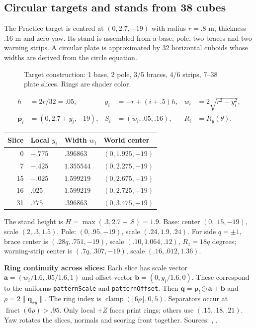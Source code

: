 \subsection{Circular targets and stands from 38 cubes}
The Practice target is centred at $(0,2.7,-19)$ with radius $r=.8$ m, thickness $.16$ m and zero yaw. Its stand is assembled from a base, pole, two braces and two warning strips. A circular plate is approximated by 32 horizontal cuboids whose widths are derived from the circle equation.
\begin{figure}[htbp]

\caption{Target construction: 1 base, 2 pole, 3/5 braces, 4/6 strips, 7--38 plate slices. Rings are shader color.}
\end{figure}
\begin{align}
 h&=2r/32=.05, & y_i&=-r+(i+.5)h, & w_i&=2\sqrt{r^2-y_i^2},\\
 \mathbf p_i&=(0,2.7+y_i,-19), & S_i&=(w_i,.05,.16), & R_i&=R_y(\theta).
\end{align}
\begin{center}\begin{tabular}{rlll}\toprule
Slice & Local $y_i$ & Width $w_i$ & World center \\\midrule
0 & $-.775$ & $.396863$ & $(0,1.925,-19)$\\
7 & $-.425$ & $1.355544$ & $(0,2.275,-19)$\\
15 & $-.025$ & $1.599219$ & $(0,2.675,-19)$\\
16 & $.025$ & $1.599219$ & $(0,2.725,-19)$\\
31 & $.775$ & $.396863$ & $(0,3.475,-19)$\\\bottomrule
\end{tabular}\end{center}
The stand height is $H=\max(.3,2.7-.8)=1.9$. Base: center $(0,.15,-19)$, scale $(2,.3,1.5)$. Pole: $(0,.95,-19)$, scale $(.24,1.9,.24)$. For side $q=\pm1$, brace center is $(.28q,.751,-19)$, scale $(.10,1.064,.12)$, $R_z=18q$ degrees; warning-strip center is $(.7q,.307,-19)$, scale $(.16,.012,1.36)$.

\textbf{Ring continuity across slices:} Each slice has scale vector $\mathbf a=(w_i/1.6,.05/1.6,1)$ and offset vector $\mathbf b=(0,y_i/1.6,0)$. These correspond to the uniforms \texttt{patternScale} and \texttt{patternOffset}. Then $\mathbf q=\mathbf p_l\odot\mathbf a+\mathbf b$ and $\rho=2\|\mathbf q_{xy}\|$. The ring index is $\operatorname{clamp}(\lfloor6\rho\rfloor,0,5)$. Separators occur at $\operatorname{fract}(6\rho)>.95$. Only local $+Z$ faces print rings; others use $(.15,.18,.21)$. Yaw rotates the slices, normals and scoring front together. Sources: , .

